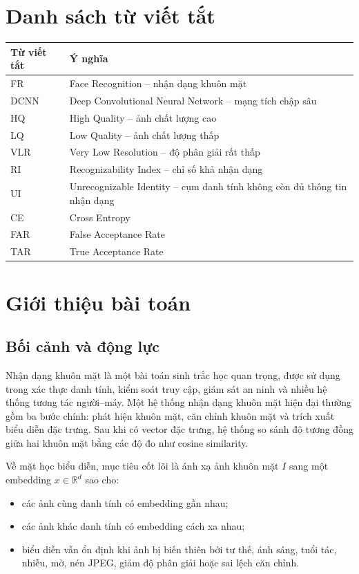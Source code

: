 \documentclass[13pt,a4paper]{extreport}
\newcommand{\R}{\mathbb{R}}
\begin{document}
\chapter*{Danh sách từ viết tắt}
\begin{longtable}{p{3cm}p{10cm}}
\toprule
\textbf{Từ viết tắt} & \textbf{Ý nghĩa}\\
\midrule
FR & Face Recognition -- nhận dạng khuôn mặt\\
DCNN & Deep Convolutional Neural Network -- mạng tích chập sâu\\
HQ & High Quality -- ảnh chất lượng cao\\
LQ & Low Quality -- ảnh chất lượng thấp\\
VLR & Very Low Resolution -- độ phân giải rất thấp\\
RI & Recognizability Index -- chỉ số khả nhận dạng\\
UI & Unrecognizable Identity -- cụm danh tính không còn đủ thông tin nhận dạng\\
CE & Cross Entropy\\
FAR & False Acceptance Rate\\
TAR & True Acceptance Rate\\
\bottomrule
\end{longtable}

\chapter{Giới thiệu bài toán}

\section{Bối cảnh và động lực}
Nhận dạng khuôn mặt là một bài toán sinh trắc học quan trọng, được sử dụng trong xác thực danh tính, kiểm soát truy cập, giám sát an ninh và nhiều hệ thống tương tác người--máy. Một hệ thống nhận dạng khuôn mặt hiện đại thường gồm ba bước chính: phát hiện khuôn mặt, căn chỉnh khuôn mặt và trích xuất biểu diễn đặc trưng. Sau khi có vector đặc trưng, hệ thống so sánh độ tương đồng giữa hai khuôn mặt bằng các độ đo như cosine similarity.

Về mặt học biểu diễn, mục tiêu cốt lõi là ánh xạ ảnh khuôn mặt $I$ sang một embedding $x \in \R^d$ sao cho:
\begin{itemize}[leftmargin=1.2cm]
    \item các ảnh cùng danh tính có embedding gần nhau;
    \item các ảnh khác danh tính có embedding cách xa nhau;
    \item biểu diễn vẫn ổn định khi ảnh bị biến thiên bởi tư thế, ánh sáng, tuổi tác, nhiễu, mờ, nén JPEG, giảm độ phân giải hoặc sai lệch căn chỉnh.
\end{itemize}
\end{document}
